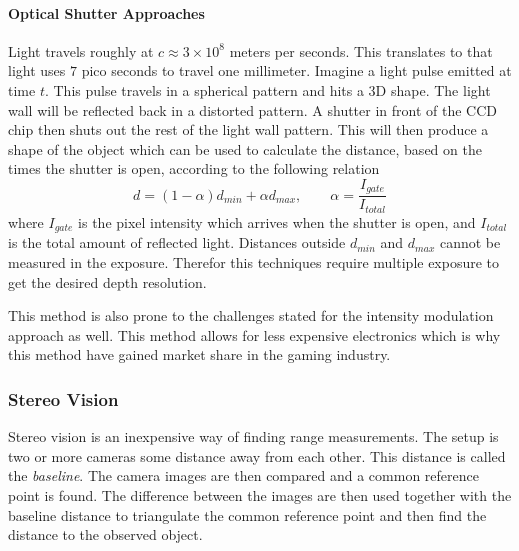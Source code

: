 \paragraph{Optical Shutter Approaches}
Light travels roughly at $c \approx 3 \times 10^8$ meters per seconds. This translates to
that light uses $7$ pico seconds to travel one millimeter. Imagine a light pulse emitted
at time $t$. This pulse travels in a spherical pattern and hits a 3D shape. The light wall
will be reflected back in a distorted pattern.\cite{optical-shutter} 
A shutter in front of the CCD chip then
shuts out the rest of the light wall pattern. This will then produce a shape of the object
which can be used to calculate the distance, based on the times the shutter is open,
according to the following relation \cite{time-of-flight-comp-graphics}
\begin{equation}
    d = (1 - \alpha) d_{min} + \alpha d_{max}, \quad \quad \alpha =
    \frac{I_{gate}}{I_{total}}
\end{equation}
where $I_{gate}$ is the pixel intensity which arrives when the shutter is open, and
$I_{total}$ is the total amount of reflected light. Distances outside $d_{min}$ and
$d_{max}$ cannot be measured in the exposure. Therefor this techniques require multiple
exposure to get the desired depth resolution. 

This method is also prone to the challenges stated for the intensity modulation approach
as well. This method allows for less expensive electronics which is why this method have
gained market share in the gaming industry. 



\subsubsection{Stereo Vision}
Stereo vision is an inexpensive way of finding range measurements. The setup is two or
more cameras some distance away from each other. This distance is called the
\emph{baseline}. The camera images are then compared and a common reference point is
found. The difference between the images are then used together with the baseline distance
to triangulate the common reference point and then find the distance to the observed
object. 

